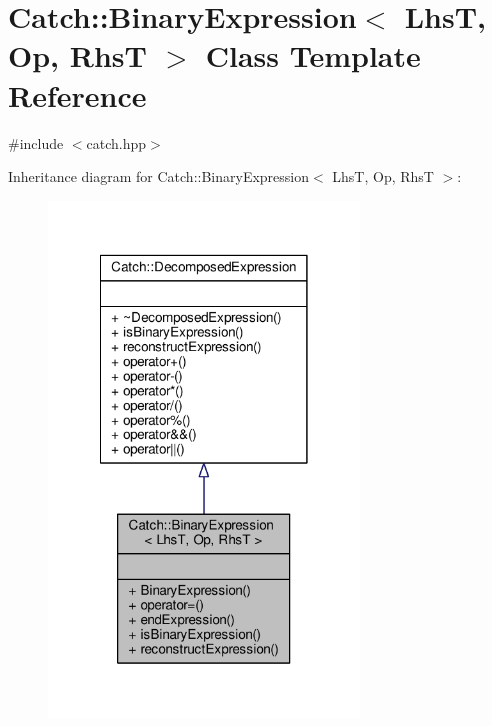\hypertarget{class_catch_1_1_binary_expression}{\section{Catch\-:\-:Binary\-Expression$<$ Lhs\-T, Op, Rhs\-T $>$ Class Template Reference}
\label{class_catch_1_1_binary_expression}
}


{\ttfamily \#include $<$catch.\-hpp$>$}



Inheritance diagram for Catch\-:\-:Binary\-Expression$<$ Lhs\-T, Op, Rhs\-T $>$\-:
\nopagebreak
\begin{figure}[H]
\begin{center}
\leavevmode
\includegraphics[width=234pt]{class_catch_1_1_binary_expression__inherit__graph}
\end{center}
\end{figure}


